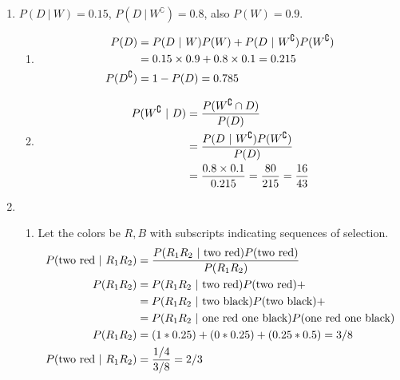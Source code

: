 \begin{enumerate}
	\item $ P(D\ |\ W) = 0.15 $, $ P(D\ |\ W^\complement) = 0.8 $, also $ P(W) = 0.9 $.
	\begin{enumerate}
		\item \begin{subequations}
			\begin{align}
				P(D) &= P(D\ |\ W)P(W) + P(D\ |\ W^\complement)P(W^\complement) \\
				&= 0.15 \times 0.9 + 0.8 \times 0.1 = 0.215 \\
				P(D^\complement) &= 1 - P(D) = 0.785
			\end{align} \\
		\end{subequations}
		
		\item \begin{subequations}
			\begin{align}
				P(W^\complement\ |\ D) &= \frac{P(W^\complement \cap D)}{P(D)} \\
				&= \frac{P(D\ |\ W^\complement) P(W^\complement)}{P(D)} \\
				&= \frac{0.8 \times 0.1}{0.215} = \frac{80}{215} = \frac{16}{43}
			\end{align} \\
		\end{subequations}
		
	\end{enumerate}
	
	\item \begin{enumerate}
		\item Let the colors be $ R, B $ with subscripts indicating sequences of selection. \\
		
		\begin{subequations}
			\begin{align}
				P(\text{two red}\ |\ R_1 R_2) &= \frac{P(R_1 R_2\ |\ \text{two red}) P(\text{two red})}{P(R_1 R_2)} \\
				P(R_1 R_2) 	&= P(R_1 R_2\ |\ \text{two red}) P(\text{two red}) + \nonumber \\
				&= P(R_1 R_2\ |\ \text{two black}) P(\text{two black}) + \nonumber \\ 
				&= P(R_1 R_2\ |\ \text{one red one black}) P(\text{one red one black}) \\
				P(R_1 R_2) 	&= ( 1 * 0.25 ) + (0 * 0.25) + (0.25 * 0.5) = 3/8 \\
				P(\text{two red}\ |\ R_1 R_2) &= \frac{1/4}{3/8} = 2/3
			\end{align} \\
		\end{subequations}
		

\end{enumerate}
\end{enumerate}
